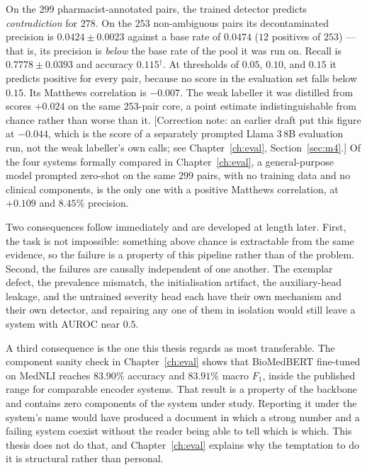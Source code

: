 On the $299$ pharmacist-annotated pairs, the trained detector predicts
\emph{contradiction} for $278$. On the $253$ non-ambiguous pairs its
decontaminated precision is $0.0424 \pm 0.0023$ against a base rate of
$0.0474$ ($12$ positives of $253$) --- that is, its precision is \emph{below}
the base rate of the pool it was run on. Recall is $0.7778 \pm 0.0393$ and
accuracy $0.115$$^{\dagger}$. At thresholds of $0.05$,
$0.10$, and $0.15$ it predicts positive for every pair, because no score in the
evaluation set falls below $0.15$. Its Matthews correlation is $-0.007$. The
weak labeller it was distilled from scores $+0.024$ on the same $253$-pair
core, a point estimate indistinguishable from chance rather than worse than
it. [Correction note: an earlier draft put this figure at $-0.044$, which is
the score of a separately prompted Llama 3\,8B evaluation run, not the weak
labeller's own calls; see Chapter~\ref{ch:eval}, Section~\ref{sec:m4}.] Of the
four systems formally compared in Chapter~\ref{ch:eval}, a general-purpose
model prompted zero-shot on the same $299$ pairs, with no training data and no
clinical components, is the only one with a positive Matthews correlation, at
$+0.109$ and $8.45\%$ precision.

Two consequences follow immediately and are developed at length later. First,
the task is not impossible: something above chance is extractable from the same
evidence, so the failure is a property of this pipeline rather than of the
problem. Second, the failures are causally independent of one another. The
exemplar defect, the prevalence mismatch, the initialisation artifact, the
auxiliary-head leakage, and the untrained severity head each have their own
mechanism and their own detector, and repairing any one of them in isolation
would still leave a system with AUROC near $0.5$.

A third consequence is the one this thesis regards as most transferable. The
component sanity check in Chapter~\ref{ch:eval} shows that BioMedBERT
fine-tuned on MedNLI reaches $83.90\%$ accuracy and $83.91\%$ macro $F_1$,
inside the published range for comparable encoder systems. That result is a
property of the backbone and contains zero components of the system under
study. Reporting it under the system's name would have produced a document in
which a strong number and a failing system coexist without the reader being
able to tell which is which. This thesis does not do that, and
Chapter~\ref{ch:eval} explains why the temptation to do it is structural rather
than personal.

